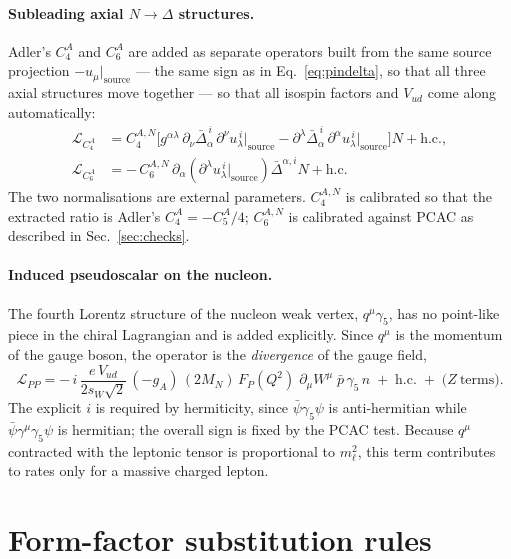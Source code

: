 \documentclass[11pt,a4paper]{article}
\begin{document}
\paragraph{Subleading axial $N\to\Delta$ structures.}
Adler's $C_4^A$ and $C_6^A$ are added as separate operators built from the same
source projection $-u_\mu|_{\text{source}}$ --- the same sign as in
Eq.~\eqref{eq:pindelta}, so that all three axial structures move together --- so
that all isospin factors and $V_{ud}$ come along automatically:
\begin{align}
  \mathcal{L}_{C_4^A} &= C_4^{A,N}
    \Big[g^{\alpha\lambda}\,\partial_\nu\bar\Delta_\alpha^{\,i}\,
         \partial^\nu u_\lambda^{\,i}\Big|_{\text{source}}
       - \partial^\lambda\bar\Delta_\alpha^{\,i}\,
         \partial^\alpha u_\lambda^{\,i}\Big|_{\text{source}}\Big] N
    + \mathrm{h.c.},\\
  \mathcal{L}_{C_6^A} &= -\,C_6^{A,N}\,
    \partial_\alpha\!\left(\partial^\lambda u_\lambda^{\,i}
      \Big|_{\text{source}}\right)
    \bar\Delta^{\alpha,i} N + \mathrm{h.c.}
  \label{eq:c6a}
\end{align}
The two normalisations are external parameters. $C_4^{A,N}$ is calibrated so
that the extracted ratio is Adler's $C_4^A = -C_5^A/4$; $C_6^{A,N}$ is
calibrated against PCAC as described in Sec.~\ref{sec:checks}.

\paragraph{Induced pseudoscalar on the nucleon.}
The fourth Lorentz structure of the nucleon weak vertex, $q^\mu\gamma_5$, has no
point-like piece in the chiral Lagrangian and is added explicitly. Since $q^\mu$
is the momentum of the gauge boson, the operator is the \emph{divergence} of the
gauge field,
\begin{equation}
  \mathcal{L}_{PP} = -\,i\,
    \frac{e\,V_{ud}}{2 s_W \sqrt 2}\,(-g_A)\,(2M_N)\,
    F_P(Q^2)\;
    \partial_\mu W^\mu\;\bar p\, \gamma_5\, n
  \;+\;\mathrm{h.c.}
  \;+\;\big(Z\ \text{terms}\big).
  \label{eq:pp}
\end{equation}
The explicit $i$ is required by hermiticity, since $\bar\psi\gamma_5\psi$ is
anti-hermitian while $\bar\psi\gamma^\mu\gamma_5\psi$ is hermitian; the overall
sign is fixed by the PCAC test. Because $q^\mu$ contracted with the leptonic
tensor is proportional to $m_\ell^2$, this term contributes to rates only for a
massive charged lepton.

\section{Form-factor substitution rules}
\label{sec:ff}
\end{document}
